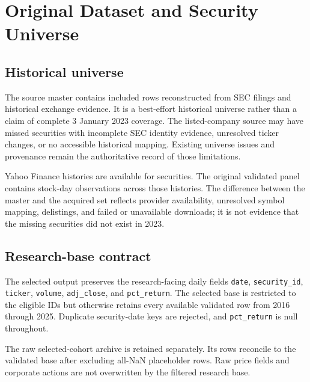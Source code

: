 \section{Original Dataset and Security Universe}

\subsection{Historical universe}

The source master contains \UniverseSecurities{} included rows reconstructed
from SEC filings and historical exchange evidence. It is a best-effort
historical universe rather than a claim of complete 3 January 2023 coverage.
\citep{secsubmissions,seccompanytickers,nasdaqtrader}
The listed-company source may have missed securities with incomplete SEC
identity evidence, unresolved ticker changes, or no accessible historical
mapping. Existing universe issues and provenance remain the authoritative
record of those limitations.

Yahoo Finance histories \citep{yfinance,yahoofinance} are available for
\AcquiredSecurities{} securities.
The original validated panel contains \OriginalValidatedObservations{}
stock-day observations across those histories. The difference between the
master and the acquired set reflects provider availability, unresolved symbol
mapping, delistings, and failed or unavailable downloads; it is not evidence
that the missing securities did not exist in 2023.

\subsection{Research-base contract}

The selected output preserves the research-facing daily fields
\texttt{date}, \texttt{security\_id}, \texttt{ticker}, \texttt{volume},
\texttt{adj\_close}, and \texttt{pct\_return}. The selected base is restricted
to the \SelectedSecurities{} eligible IDs but otherwise retains every available
validated row from 2016 through 2025. Duplicate security-date keys are rejected,
and \texttt{pct\_return} is null throughout.

The raw selected-cohort archive is retained separately. Its
\RawSelectedRows{} rows reconcile to the validated base after excluding
\PlaceholderRows{} all-NaN placeholder rows. Raw price fields and corporate
actions are not overwritten by the filtered research base.
